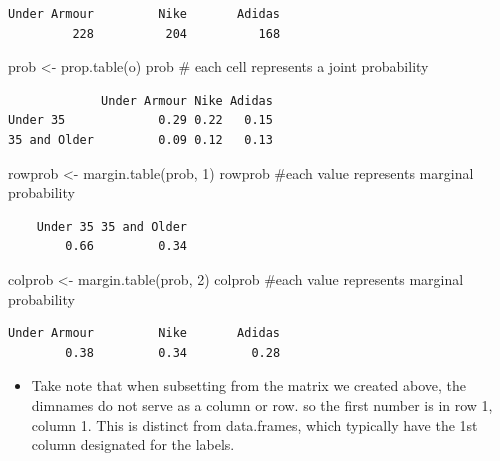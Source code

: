 \documentclass[
  letterpaper,
  DIV=11,
  numbers=noendperiod]{scrreprt}
\newenvironment{Shaded}{\begin{snugshade}}{\end{snugshade}}
\newcommand{\CommentTok}[1]{\textcolor[rgb]{0.37,0.37,0.37}{#1}}
\newcommand{\DecValTok}[1]{\textcolor[rgb]{0.68,0.00,0.00}{#1}}
\newcommand{\FunctionTok}[1]{\textcolor[rgb]{0.28,0.35,0.67}{#1}}
\newcommand{\NormalTok}[1]{\textcolor[rgb]{0.00,0.23,0.31}{#1}}
\newcommand{\OtherTok}[1]{\textcolor[rgb]{0.00,0.23,0.31}{#1}}
\providecommand{\tightlist}{%
  \setlength{\itemsep}{0pt}\setlength{\parskip}{0pt}}\usepackage{longtable,booktabs,array}
\begin{document}
\begin{verbatim}
Under Armour         Nike       Adidas 
         228          204          168 
\end{verbatim}

\begin{Shaded}
\begin{Highlighting}[]
\NormalTok{prob }\OtherTok{\textless{}{-}} \FunctionTok{prop.table}\NormalTok{(o)}
\NormalTok{prob  }\CommentTok{\# each cell represents a joint probability}
\end{Highlighting}
\end{Shaded}

\begin{verbatim}
             Under Armour Nike Adidas
Under 35             0.29 0.22   0.15
35 and Older         0.09 0.12   0.13
\end{verbatim}

\begin{Shaded}
\begin{Highlighting}[]
\NormalTok{rowprob }\OtherTok{\textless{}{-}} \FunctionTok{margin.table}\NormalTok{(prob, }\DecValTok{1}\NormalTok{)}
\NormalTok{rowprob  }\CommentTok{\#each value represents marginal probability}
\end{Highlighting}
\end{Shaded}

\begin{verbatim}
    Under 35 35 and Older 
        0.66         0.34 
\end{verbatim}

\begin{Shaded}
\begin{Highlighting}[]
\NormalTok{colprob }\OtherTok{\textless{}{-}} \FunctionTok{margin.table}\NormalTok{(prob, }\DecValTok{2}\NormalTok{)}
\NormalTok{colprob  }\CommentTok{\#each value represents marginal probability}
\end{Highlighting}
\end{Shaded}

\begin{verbatim}
Under Armour         Nike       Adidas 
        0.38         0.34         0.28 
\end{verbatim}

\begin{itemize}
\tightlist
\item
  Take note that when subsetting from the matrix we created above, the
  dimnames do not serve as a column or row. so the first number is in
  row 1, column 1. This is distinct from data.frames, which typically
  have the 1st column designated for the labels.
\end{itemize}
\end{document}
